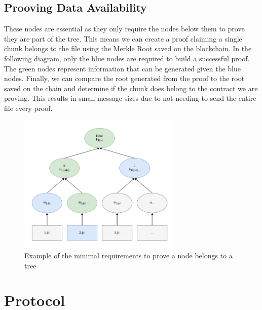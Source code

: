 \documentclass[a4paper]{article}
\begin{document}
\subsection{Prooving Data Availability}
These nodes are essential as they only require the nodes below them to prove they are part of the tree. This means we can create a proof claiming a single chunk belongs to the file using the Merkle Root saved on the blockchain. In the following diagram, only the blue nodes are required to build a successful proof. The green nodes represent information that can be generated given the blue nodes. Finally, we can compare the root generated from the proof to the root saved on the chain and determine if the chunk does belong to the contract we are proving. This results in small message sizes due to not needing to send the entire file every proof.
\begin{figure}[!htbp]
\centering
\includegraphics[width=0.7\textwidth]{assets/tree3.png}
\caption{Example of the minimal requirements to prove a node belongs to a tree}
\end{figure}

\newpage
\section{Protocol}
\end{document}
